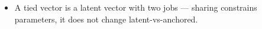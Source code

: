 \begin{itemize}
    \item A tied vector is a latent vector with two jobs — sharing constrains parameters, it does not change latent-vs-anchored. 

\end{itemize}
